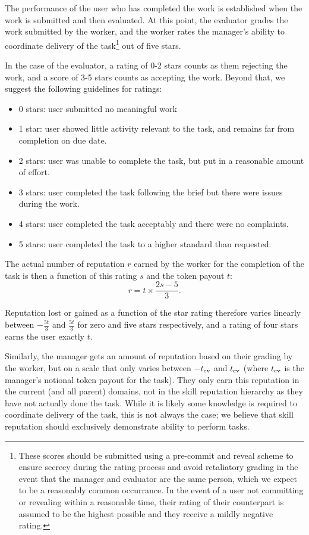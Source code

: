 The performance of the user who has completed the work is established when the work is submitted and then evaluated. At this point, the evaluator grades the work submitted by the worker, and the worker rates the manager's ability to coordinate delivery of the task\footnote{These scores should be submitted using a pre-commit and reveal scheme to ensure secrecy during the rating process and avoid retaliatory grading in the event that the manager and evaluator are the same person, which we expect to be a reasonably common occurrance. In the event of a user not committing or revealing within a reasonable time, their rating of their counterpart is assumed to be the highest possible and they receive a mildly negative rating. } out of five stars.

In the case of the evaluator, a rating of 0-2 stars counts as them rejecting the work, and a score of 3-5 stars counts as accepting the work. Beyond that, we suggest the following guidelines for ratings:
\begin{itemize}
 \item[] 0 stars: user submitted no meaningful work 
 \item[]1 star:\phantom{s} user showed little activity relevant to the task, and remains far from completion on due date.
 \item[]2 stars: user was unable to complete the task, but put in a reasonable amount of effort.
 \item[]3 stars: user completed the task following the brief but there were issues during the work.
 \item[]4 stars: user completed the task acceptably and there were no complaints.
 \item[]5 stars: user completed the task to a higher standard than requested.
\end{itemize}

The actual number of reputation $r$ earned by the worker for the completion of the task is then a function of this rating $s$ and the token payout $t$:
\begin{equation*}\label{eq:stars-to-rep}
 r = t \times \frac{2s - 5}{3}.
\end{equation*}
 
Reputation lost or gained as a function of the star rating therefore varies linearly between $-\frac{5t}{3}$ and $\frac{5t}{3}$ for zero and five stars respectively, and a rating of four stars earns the user exactly $t$. 

Similarly, the manager gets an amount of reputation based on their grading by the worker, but on a scale that only varies between $-t_{\rm ev}$ and $t_{\rm ev}$ (where $t_{\rm ev}$ is the manager's notional token payout for the task). They only earn this reputation in the current (and all parent) domains, not in the skill reputation hierarchy as they have not actually done the task. While it is likely some knowledge is required to coordinate delivery of the task, this is not always the case; we believe that skill reputation should exclusively demonstrate ability to perform tasks.

